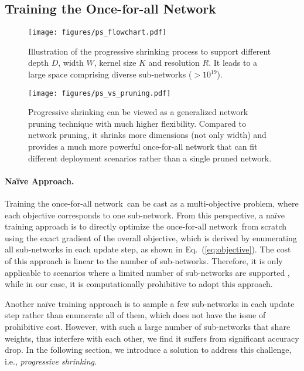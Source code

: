 \documentclass{article} \usepackage{iclr2020_conference,times}
\newcommand{\myparagraph}[1]{\vspace{-3pt}\paragraph{#1}}
\newcommand{\motherNet}{once-for-all network}
\newcommand{\motherNetCap}{Once-for-all Network}
\begin{document}
\subsection{Training the \motherNetCap}
\label{sec:ofa_train}

\begin{figure}[t]
\vspace{-20pt}
    \centering
    \texttt{[image: figures/ps\_flowchart.pdf]}
    \caption{Illustration of the progressive shrinking process to support different depth $D$, width $W$, kernel size $K$ and resolution $R$. It leads to a large space comprising diverse sub-networks ($> 10^{19}$).}\label{fig:algo_flowchart}
\end{figure}

\begin{figure}[t]
\vspace{-10pt}
    \centering
    \texttt{[image: figures/ps\_vs\_pruning.pdf]}
    \caption{Progressive shrinking can be viewed as a generalized network pruning technique with much higher flexibility. Compared to network pruning, it shrinks more dimensions (not only width) and provides a much more powerful once-for-all network that can fit different deployment scenarios rather than a single pruned network.}\label{fig:ps_vs_pruning}
\end{figure}

\myparagraph{Na\"{i}ve Approach.} Training the \motherNet~can be cast as a multi-objective problem, where each objective corresponds to one sub-network. From this perspective, a na\"{i}ve training approach is to directly optimize the  \motherNet~from scratch using the exact gradient of the overall objective, which is derived by enumerating all sub-networks in each update step, as shown in Eq.~(\ref{eq:objective}). The cost of this approach is linear to the number of sub-networks. Therefore, it is only applicable to scenarios where a limited number of sub-networks are supported \citep{yu2018slimmable}, while in our case, it is computationally prohibitive to adopt this approach. 

Another na\"{i}ve training approach is to sample a few sub-networks in each update step rather than enumerate all of them, which does not have the issue of prohibitive cost. However, with such a large number of sub-networks that share weights, thus interfere with each other, we find it suffers from significant accuracy drop. In the following section, we introduce a solution to address this challenge, i.e., \emph{progressive shrinking}. 
\end{document}
